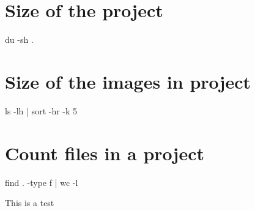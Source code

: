 \documentclass{article}
\begin{document}
\section{Size of the project}

\bash[stdout]
du -sh .
\END

\section{Size of the images in project}
\bash[stdout]
ls -lh | sort -hr -k 5
\END

\section{Count files in a project}
\bash[stdout]
find . -type f | wc -l
\END

This is a test
\end{document}
